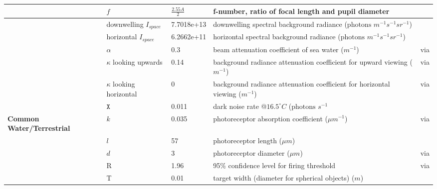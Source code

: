 \begin{tabular}{|L{3.5cm}|L{2cm}|L{2cm}|L{4.5cm}|L{4.5cm}|}
 &$f$&$\frac{2.55A}{2}$&f-number, ratio of focal length and pupil diameter&\cite{Nils14a}\\\hline
 &downwelling $I_{space}$&7.7018e+13&downwelling spectral background radiance ($\text{photons } m^{-1} s^{-1} sr^{-1}$)&\cite{Nils14a}\\\hline
 &horizontal $I_{space}$&6.2662e+11&horizontal spectral background radiance ($\text{photons } m^{-1} s^{-1} sr^{-1}$)&\cite{Nils14a}\\\hline
 &$\alpha$&0.3&beam attenuation coefficient of sea water ($m^{-1}$)&\cite{John02a} via \cite{Nils14a}\\\hline
 &$\kappa$ looking upwards&0.14&background radiance attenuation coefficient for upward viewing ($m^{-1}$)&\cite{John02a} via \cite{Nils14a}\\\hline
 &$\kappa$ looking horizontal&0&background radiance attenuation coefficient for horizontal viewing ($m^{-1}$)&\cite{John02a} via \cite{Nils14a}\\\hline
 &$\mathtt{X}$&0.011&dark noise rate @$16.5^{\circ} C$ ($\text{photons } s^{-1}$&\cite{Aho93a}\\\hline
\textbf{Common Water/Terrestrial}&$k$&0.035&photoreceptor absorption coefficient ($\mu m^{-1}$)&\cite{Part90a} via \cite{Warr98a}\\\hline
 &$l$&57&photoreceptor length ($\mu m$)&\cite{Nils14a}\\\hline
 &$d$&3&photoreceptor diameter ($\mu m$)&\cite{Land12a} via \cite{Nils14a}\\\hline
 &R&1.96&95\% confidence level for firing threshold&\cite{Land81a} via \cite{Nils14a}\\\hline
 &T&0.01&target width (diameter for spherical objects) ($m$)& \\\hline
\end{tabular}
